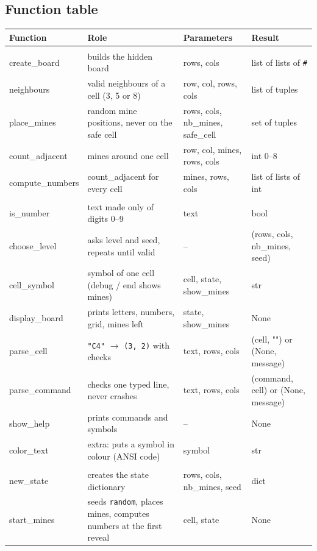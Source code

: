 \documentclass[11pt,a4paper]{article}
\newcommand{\code}[1]{\texttt{#1}}
\begin{document}
\subsection{Function table}
{\footnotesize
\begin{longtable}{>{\ttfamily}p{2.9cm} p{5.6cm} p{4.2cm} p{2.8cm}}
\toprule
\textrm{\textbf{Function}} & \textbf{Role} & \textbf{Parameters} & \textbf{Result} \\
\midrule
\endhead
\multicolumn{4}{l}{\textit{board.py}}\\
create\_board & builds the hidden board & rows, cols & list of lists of \code{\#} \\
neighbours & valid neighbours of a cell (3, 5 or 8) & row, col, rows, cols & list of tuples \\
place\_mines & random mine positions, never on the safe cell & rows, cols, nb\_mines, safe\_cell & set of tuples \\
count\_adjacent & mines around one cell & row, col, mines, rows, cols & int 0--8 \\
compute\_numbers & count\_adjacent for every cell & mines, rows, cols & list of lists of int \\
\midrule
\multicolumn{4}{l}{\textit{interface.py}}\\
is\_number & text made only of digits 0--9 & text & bool \\
choose\_level & asks level and seed, repeats until valid & -- & (rows, cols, nb\_mines, seed) \\
cell\_symbol & symbol of one cell (debug / end shows mines) & cell, state, show\_mines & str \\
display\_board & prints letters, numbers, grid, mines left & state, show\_mines & None \\
parse\_cell & \code{"C4"} $\rightarrow$ \code{(3, 2)} with checks & text, rows, cols & (cell, "") or (None, message) \\
parse\_command & checks one typed line, never crashes & text, rows, cols & (command, cell) or (None, message) \\
show\_help & prints commands and symbols & -- & None \\
color\_text & extra: puts a symbol in colour (ANSI code) & symbol & str \\
\midrule
\multicolumn{4}{l}{\textit{game\_logic.py}}\\
new\_state & creates the state dictionary & rows, cols, nb\_mines, seed & dict \\
start\_mines & seeds \code{random}, places mines, computes numbers at the first reveal & cell, state & None \\

\end{longtable}}
\end{document}
